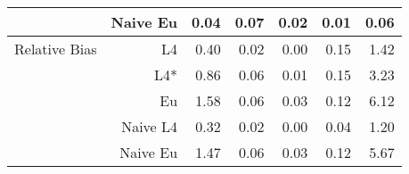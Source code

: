 \documentclass[a4paper,12pt,twoside]{book}
\begin{document}
\begin{table}[H]
\begin{tabular}{crrrrrr}
&Naive Eu &   0.04 & 0.07 & 0.02 & 0.01 & 0.06 \\ 
   
  
   \hline
   
{\color{blue} Relative Bias } & L4  &0.40 & 0.02 & 0.00 & 0.15 & 1.42 \\ 
 
&L4*  & 0.86 & 0.06 & 0.01 & 0.15 & 3.23 \\ 
  
  
&Eu &  
   1.58 & 0.06 & 0.03 & 0.12 & 6.12 \\ 
  
&Naive L4&  
  
  0.32 & 0.02 & 0.00 & 0.04 & 1.20 \\ 
 
  
  
&Naive Eu &  
  1.47 & 0.06 & 0.03 & 0.12 & 5.67 \\ 
  
\end{tabular}

\end{table}
\end{document}
